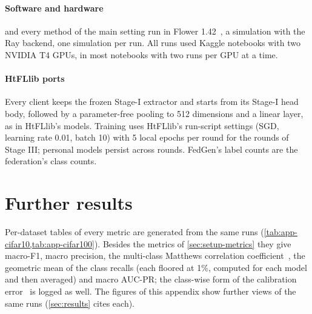 \paragraph{Software and hardware} \ours and every method of the main setting run in Flower
1.42~\cite{beutel2020flower}, a simulation with the Ray backend, one simulation per run. All runs used Kaggle notebooks
with two NVIDIA T4 GPUs, in most notebooks with two runs per GPU at a time.

\paragraph{HtFLlib ports} Every client keeps the frozen Stage-I extractor and starts from its Stage-I head body,
followed by a parameter-free pooling to 512 dimensions and a linear layer, as in HtFLlib's models. Training uses
HtFLlib's run-script settings (SGD, learning rate 0.01, batch 10) with 5 local epochs per round for the rounds of
Stage III; personal models persist across rounds. FedGen's label counts are the federation's class counts.

\section{Further results}\label{app:more}

Per-dataset tables of every metric are generated from the same runs (\cref{tab:app-cifar10,tab:app-cifar100}).
Besides the metrics of \cref{sec:setup-metrics} they give macro-F1, macro precision, the multi-class Matthews
correlation coefficient~\cite{gorodkin2004mcc}, the geometric mean of the class recalls (each floored at 1\%, computed
for each model and then averaged) and macro AUC-PR; the class-wise form of the calibration
error~\cite{kull2019classwise} is logged as well. The figures of this appendix show further views of the same runs
(\cref{sec:results} cites each).

\begin{widetable}[t]
\centering\small
\caption{CIFAR-10-LT (imbalance ratio 100, 10 clients, Dirichlet $\alpha=0.5$): main metrics (\%); \ours with its readout, its heads only, other methods without the readout;
mean $\pm$ standard deviation over seeds 3--5. Tail: 40\% least frequent classes; G-mean with recalls floored at 1\%.}
\label{tab:app-cifar10}
\end{widetable}

